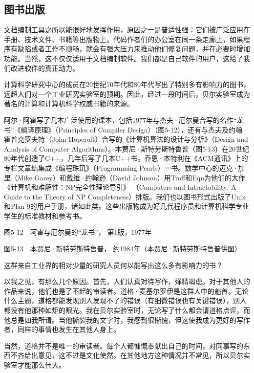 \documentclass[a4paper,12pt,UTF8,twoside]{ctexbook}
\begin{document}
\subsection{图书出版}

文档编制工具之所以能很好地发挥作用，原因之一是普适性强：它们被广泛应用在手册、技术文件、书籍等出版物上。代码作者们的办公室在同一条走廊上，如果程序有缺陷或者工作不顺畅，就会有强大压力来推动他们修复问题，并在必要时增加功能。当然，这不仅仅适用于文档编制软件。我们都是自己软件的用户，这给了我们改进软件的真正动力。

计算科学研究中心的成员在20世纪70年代和80年代写出了特别多有影响力的图书，远超人们对一个工业研究实验室的预期。因此，经过一段时间后，贝尔实验室成为著名的计算和计算机科学权威书籍的来源。

阿尔·阿霍写了几本广泛使用的课本，包括1977年与杰夫·厄尔曼合写的名作“龙书”《编译原理》（Principles of Compiler Design）（图5-12），还有与杰夫及约翰·霍普克罗夫特（John Hopcroft）合写的《计算机算法的设计与分析》（Design and Analysis of Computer Algorithms）。本贾尼·斯特劳斯特鲁普（图5-13）在20世纪80年代创造了C++，几年后写了几本C++书。乔恩·本特利在《ACM通讯》上的专栏文章结集成《编程珠玑》（Programming Pearls）一书。数学中心的迈克·加里（Mike Garey）和戴维·约翰逊（David Johnson）用Troff和Eqn为他们的大作《计算机和难解性：NP完全性理论导引》 （Computers and Intractability: A Guide to the Theory of NP Completeness）排版。我们也以图书形式出版了Unix 和Plan 9的用户手册，诸如此类。这些出版物成为好几代程序员和计算机科学专业学生的标准教材和参考书。



图5-12　阿霍与厄尔曼的“龙书”， 第1版，1977年



图5-13　本贾尼·斯特劳斯特鲁普， 约1984年（本贾尼·斯特劳斯特鲁普供图）

这群来自工业界的相对少量的研究人员何以能写出这么多有影响力的书？

以我之见，有那么几个原因。首先，人们认真对待写作，殚精竭虑。对于其他人的作品来说，他们也是了不起的审读者。道格·麦基尔罗伊是这群人中的魁首。无论什么主题，道格都能发现别人发现不了的错误（有细微错误也有关键错误），别人都没有他那种如炬的眼光。我在贝尔实验室时，无论写了什么都会请道格点评，而他总是如我所请。当他撕裂我的文字时，我感到很惭愧，但这使我成为更好的写作者，同样的事情也发生在其他人身上。

当然，道格并不是唯一的审读者。每个人都慷慨奉献出自己的时间，对同事写的东西不吝给出意见，这不过是文化使然。在其他地方这种情况并不常见，所以贝尔实验室才能那么伟大。
\end{document}
